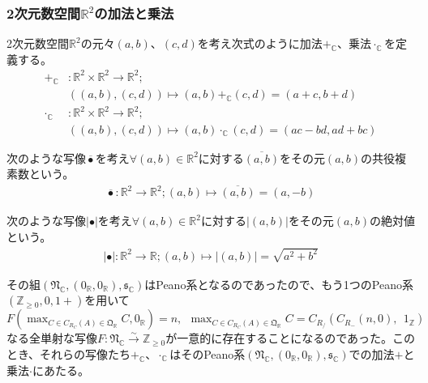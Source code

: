 \documentclass[dvipdfmx]{jsarticle}
\begin{document}
\subsubsection{2次元数空間$\mathbb{R}^{2}$の加法と乗法}%
\begin{dfn}
2次元数空間$\mathbb{R}^{2}$の元々$(a,b)$、$(c,d)$を考え次式のように加法$+_{\mathbb{C}}$、乗法$\cdot_{\mathbb{C}}$を定義する。
\begin{align*}
+_{\mathbb{C}}&:\mathbb{R}^{2} \times \mathbb{R}^{2} \rightarrow \mathbb{R}^{2};\\
&\left( (a,b),(c,d) \right) \mapsto (a,b) +_{\mathbb{C}}(c,d) = (a + c,b + d)\\
\cdot_{\mathbb{C}}&:\mathbb{R}^{2} \times \mathbb{R}^{2} \rightarrow \mathbb{R}^{2};\\
&\left( (a,b),(c,d) \right) \mapsto (a,b) \cdot_{\mathbb{C}}(c,d) = (ac - bd,ad + bc)
\end{align*}
\end{dfn}
\begin{dfn}
次のような写像$\overline{\bullet}$を考え$\forall(a,b) \in \mathbb{R}^{2}$に対する$\overline{(a,b)}$をその元$(a,b)$の共役複素数という。
\begin{align*}
\overline{\bullet}:\mathbb{R}^{2} \rightarrow \mathbb{R}^{2};(a,b) \mapsto \overline{(a,b)} = (a, - b)
\end{align*}
\end{dfn}
\begin{dfn}
次のような写像$| \bullet |$を考え$\forall(a,b) \in \mathbb{R}^{2}$に対する$\left| (a,b) \right|$をその元$(a,b)$の絶対値という。
\begin{align*}
| \bullet |:\mathbb{R}^{2} \rightarrow \mathbb{R};(a,b) \mapsto \left| (a,b) \right| = \sqrt{a^{2} + b^{2}}
\end{align*}
\end{dfn}
\begin{thm}\label{1.2.6.44}
その組$\left( \mathfrak{N}_{\mathbb{C}},\left( 0_{\mathbb{R}},0_{\mathbb{R}} \right),\mathfrak{s}_{\mathbb{C}} \right)$はPeano系となるのであったので、もう1つのPeano系$\left( \mathbb{Z}_{\geq 0},0,1 + \right)$を用いて$F\left( \max_{C \in C_{R_{C}}(A) \in \mathfrak{Q}_{\mathbb{R}}}C,0_{\mathbb{R}} \right) = n,\ \ \max_{C \in C_{R_{C}}(A) \in \mathfrak{Q}_{\mathbb{R}}}C = C_{R_{/}}\left( C_{R_{-}}(n,0),\ \ 1_{\mathbb{Z}} \right)$なる全単射な写像$F:\mathfrak{N}_{\mathbb{C}}\overset{\sim}{\rightarrow}\mathbb{Z}_{\geq 0}$が一意的に存在することになるのであった。このとき、それらの写像たち$+_{\mathbb{C}}$、$\cdot_{\mathbb{C}}$はそのPeano系$\left( \mathfrak{N}_{\mathbb{C}},\left( 0_{\mathbb{R}},0_{\mathbb{R}} \right),\mathfrak{s}_{\mathbb{C}} \right)$での加法$+$と乗法$\cdot$にあたる。
\end{thm}
\end{document}
